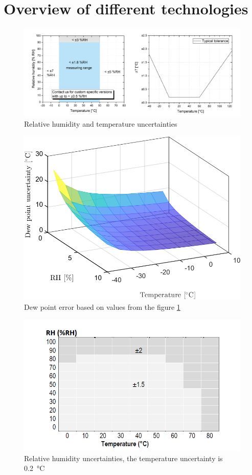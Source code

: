\section{Overview of different technologies}


\begin{figure}[!h]
\centering
\includegraphics[width=0.8\columnwidth]{Chapter6/images/hyt221_rh.png}
\caption{Relative humidity and temperature uncertainties \cite{hyt221}}
\label{fig:hyt221}
\end{figure}
\begin{figure}[!h]
\centering
\includegraphics[width=0.6\columnwidth]{Chapter6/images/HYT221RH7T15.png}
\caption{Dew point error based on values from the figure \ref{fig:hyt221}}
\label{fig:hyt221_dp}
\end{figure}

\begin{figure}[!h]
\centering
\includegraphics[width=0.65\columnwidth]{Chapter6/images/sht85_rh.png}
\caption{Relative humidity uncertainties, the temperature uncertainty is \SI{0.2}{\celsius} \cite{SHT85}}
\label{fig:sht85}
\end{figure}

